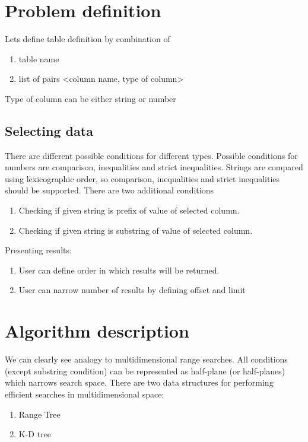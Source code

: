 \documentclass[10pt,a4paper]{article}
\begin{document}

\section{Problem definition}

Lets define table definition by combination of
\begin{enumerate}
\item table name
\item list of pairs <column name, type of column>
\end{enumerate}
Type of column can be either string or number

\subsection{Selecting data}
There are different possible conditions for different types. Possible conditions for numbers are comparison, inequalities and strict inequalities. Strings are compared using lexicographic order, so comparison, inequalities and strict inequalities should be supported. There are two additional conditions
\begin{enumerate}
\item Checking if given string is prefix of value of selected column. 
\item Checking if given string is substring of value of selected column. 
\end{enumerate}
Presenting results:
\begin{enumerate}
\item User can define order in which results will be returned.
\item User can narrow number of results by defining offset and limit
\end{enumerate}

\section{Algorithm description}
We can clearly see analogy to multidimensional range searches. All conditions (except substring condition) can be represented as half-plane (or half-planes) which narrows search space. There are two data structures for performing efficient searches in multidimensional space:

\begin{enumerate}
\item Range Tree \cite{CGAAA}
\item K-D tree \cite{CGAAA}
\end{enumerate}
\end{document}
